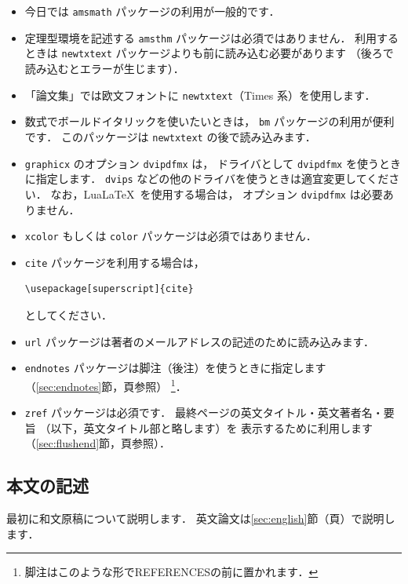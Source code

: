 \documentclass{jjsce}%
\begin{document}
\begin{itemize}
\item
今日では \texttt{amsmath} パッケージの利用が一般的です．
\item 
定理型環境を記述する \texttt{amsthm} パッケージは必須ではありません．
利用するときは
\texttt{newtxtext} パッケージよりも前に読み込む必要があります
（後ろで読み込むとエラーが生じます）．
\item 
「論文集」では欧文フォントに
\texttt{newtxtext}（Times 系）を使用します．
\item
数式でボールドイタリックを使いたいときは，
\texttt{bm} パッケージの利用が便利です．
このパッケージは \texttt{newtxtext} の後で読み込みます．
\item
\verb/graphicx/ のオプション \texttt{dvipdfmx} は，
ドライバとして \texttt{dvipdfmx} を使うときに指定します．
\texttt{dvips} などの他のドライバを使うときは適宜変更してください．
なお，Lua\LaTeX\ を使用する場合は，
オプション \texttt{dvipdfmx} は必要ありません．
\item
\texttt{xcolor} もしくは \texttt{color} パッケージは必須ではありません．
\item
\texttt{cite} パッケージを利用する場合は，
\begin{verbatim}
\usepackage[superscript]{cite}
\end{verbatim}
としてください．


\item
\texttt{url} パッケージは著者のメールアドレスの記述のために読み込みます．
\item 
\texttt{endnotes} パッケージは脚注（後注）を使うときに指定します
（\ref{sec:endnotes}節，\pageref{sec:endnotes}頁参照）%
\footnote{脚注はこのような形でREFERENCESの前に置かれます．}．
\item 
\texttt{zref} パッケージは必須です．
最終ページの英文タイトル・英文著者名・要旨
（以下，英文タイトル部と略します）を
表示するために利用します（\ref{sec:flushend}節，\pageref{sec:flushend}頁参照）．
\end{itemize}

\subsection{本文の記述}

最初に和文原稿について説明します．
英文論文は\ref{sec:english}節（\pageref{sec:english}頁）で説明します．
\end{document}
